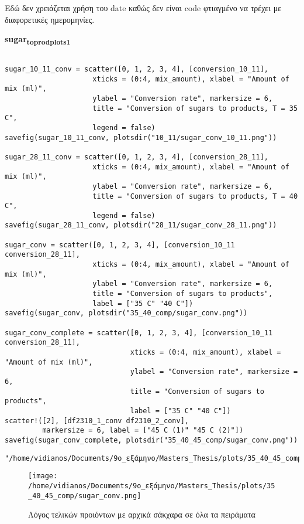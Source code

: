 \documentclass[11pt]{article}
\begin{document}
Εδώ δεν χρειάζεται χρήση του date καθώς δεν είναι code φτιαγμένο να τρέχει με διαφορετικές ημερομηνίες.

\textbf{sugar\textsubscript{to}\textsubscript{prod}\textsubscript{plots}\textsubscript{1}}
\begin{verbatim}

sugar_10_11_conv = scatter([0, 1, 2, 3, 4], [conversion_10_11],
                     xticks = (0:4, mix_amount), xlabel = "Amount of mix (ml)",
                     ylabel = "Conversion rate", markersize = 6,
                     title = "Conversion of sugars to products, T = 35 C",
                     legend = false)
savefig(sugar_10_11_conv, plotsdir("10_11/sugar_conv_10_11.png"))

sugar_28_11_conv = scatter([0, 1, 2, 3, 4], [conversion_28_11],
                     xticks = (0:4, mix_amount), xlabel = "Amount of mix (ml)",
                     ylabel = "Conversion rate", markersize = 6,
                     title = "Conversion of sugars to products, T = 40 C",
                     legend = false)
savefig(sugar_28_11_conv, plotsdir("28_11/sugar_conv_28_11.png"))

sugar_conv = scatter([0, 1, 2, 3, 4], [conversion_10_11 conversion_28_11],
                     xticks = (0:4, mix_amount), xlabel = "Amount of mix (ml)",
                     ylabel = "Conversion rate", markersize = 6,
                     title = "Conversion of sugars to products",
                     label = ["35 C" "40 C"])
savefig(sugar_conv, plotsdir("35_40_comp/sugar_conv.png"))

sugar_conv_complete = scatter([0, 1, 2, 3, 4], [conversion_10_11 conversion_28_11],
                              xticks = (0:4, mix_amount), xlabel = "Amount of mix (ml)",
                              ylabel = "Conversion rate", markersize = 6,
                              title = "Conversion of sugars to products",
                              label = ["35 C" "40 C"])
scatter!([2], [df2310_1_conv df2310_2_conv],
         markersize = 6, label = ["45 C (1)" "45 C (2)"])
savefig(sugar_conv_complete, plotsdir("35_40_45_comp/sugar_conv.png"))
\end{verbatim}

\begin{verbatim}
"/home/vidianos/Documents/9o_εξάμηνο/Masters_Thesis/plots/35_40_45_comp/sugar_conv.png"
\end{verbatim}


\begin{figure}[htbp]
\centering
\texttt{[image: /home/vidianos/Documents/9o\_εξάμηνο/Masters\_Thesis/plots/35\_40\_45\_comp/sugar\_conv.png]}
\caption{Λόγος τελικών προιόντων με αρχικά σάκχαρα σε όλα τα πειράματα}
\end{figure}
\end{document}
